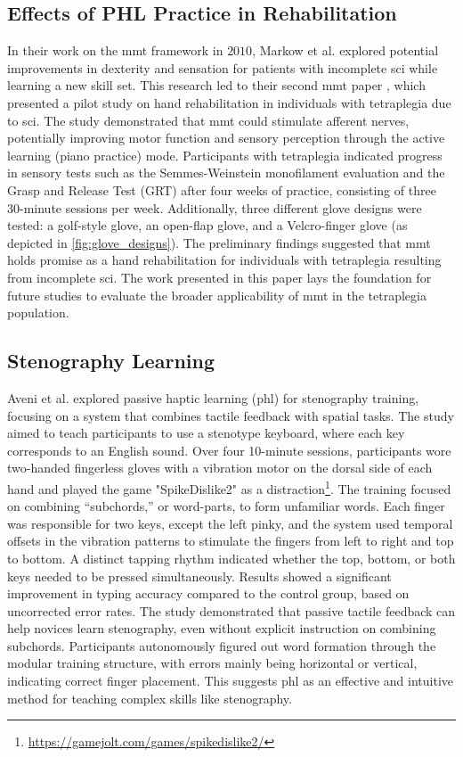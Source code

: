 \subsection{Effects of PHL Practice in Rehabilitation}
In their work on the \gls{mmt} framework in $2010$, Markow et al. explored potential improvements in dexterity and sensation for patients with incomplete \gls{sci} while learning a new skill set. This research led to their second \gls{mmt} paper \cite{Markow2010}, which presented a pilot study on hand rehabilitation in individuals with tetraplegia due to \gls{sci}.
The study demonstrated that \gls{mmt} could stimulate afferent nerves, potentially improving motor function and sensory perception through the active learning (piano practice) mode. Participants with tetraplegia indicated progress in sensory tests such as the Semmes-Weinstein monofilament evaluation and the Grasp and Release Test (GRT) after four weeks of practice, consisting of three 30-minute sessions per week. Additionally, three different glove designs were tested: a golf-style glove, an open-flap glove, and a Velcro-finger glove (as depicted in \autoref{fig:glove_designs}).
The preliminary findings suggested that \gls{mmt} holds promise as a hand rehabilitation for individuals with tetraplegia resulting from incomplete \gls{sci}. The work presented in this paper lays the foundation for future studies to evaluate the broader applicability of \gls{mmt} in the tetraplegia population.

\subsection{Stenography Learning}

Aveni et al. \cite{Aveni2019} explored passive haptic learning (\gls{phl}) for stenography training, focusing on a system that combines tactile feedback with spatial tasks. The study aimed to teach participants to use a stenotype keyboard, where each key corresponds to an English sound. Over four 10-minute sessions, participants wore two-handed fingerless gloves with a vibration motor on the dorsal side of each hand and played the game "SpikeDislike2" as a distraction\footnote{\url{https://gamejolt.com/games/spikedislike2/}}.
The training focused on combining “subchords,” or word-parts, to form unfamiliar words. Each finger was responsible for two keys, except the left pinky, and the system used temporal offsets in the vibration patterns to stimulate the fingers from left to right and top to bottom. A distinct tapping rhythm indicated whether the top, bottom, or both keys needed to be pressed simultaneously.
Results showed a significant improvement in typing accuracy compared to the control group, based on uncorrected error rates.
The study demonstrated that passive tactile feedback can help novices learn stenography, even without explicit instruction on combining subchords. Participants autonomously figured out word formation through the modular training structure, with errors mainly being horizontal or vertical, indicating correct finger placement. This suggests \gls{phl} as an effective and intuitive method for teaching complex skills like stenography.